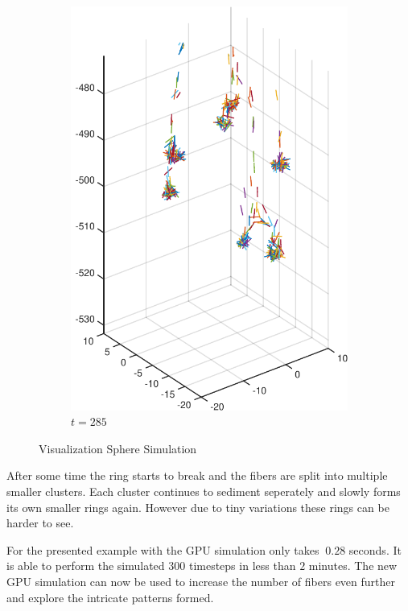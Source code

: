\documentclass[a4paper,11pt]{kth-mag}
\begin{document}
\begin{figure}
\begin{subfigure}[h]{0.4\textwidth}
    \includegraphics[width=\textwidth]{img/sphere_00250.pdf}
    \caption{$t=285$}\label{fig:sphere_simulation_1d}
  \end{subfigure}
  \caption{Visualization Sphere Simulation}
  \label{fig:sphere_simulation}
\end{figure}

After some time the ring starts to break and the fibers are split into multiple smaller clusters. Each cluster continues to sediment seperately and slowly forms its own smaller rings again. However due to tiny variations these rings can be harder to see.

For the presented example with the GPU simulation only takes $~0.28$ seconds. It is able to perform the simulated $300$ timesteps in less than $2$ minutes. The new GPU simulation can now be used to increase the number of fibers even further and explore the intricate patterns formed.
\end{document}
